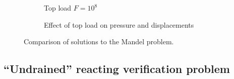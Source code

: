 \documentclass[11pt]{article}
\begin{document}
\begin{figure}[htbp]
  \centering
  \begin{subfigure}[b]{0.50\textwidth} %
    \centering
    \resizebox{\linewidth}{13cm}{}
    \caption{Top load $F=10^8$}
    \label{fig:mandel_1e8}
  \end{subfigure}\hfill
  \begin{subfigure}[b]{0.50\textwidth} %
    \centering
    \resizebox{\linewidth}{13cm}{}
    \caption{Effect of top load on pressure and displacements}
    \label{fig:mandel_1e9}
  \end{subfigure}
  \caption{Comparison of solutions to the Mandel problem.}
  \label{fig:mandel}
\end{figure}


\subsection{``Undrained'' reacting verification problem}\label{sec:undrained}
\end{document}
